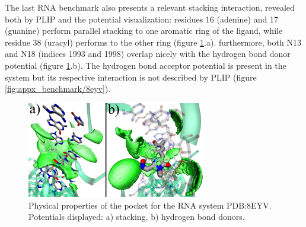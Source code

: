       The last RNA benchmark also presents a relevant stacking interaction, revealed both by PLIP and the potential visualization: residues 16 (adenine) and 17 (guanine) perform parallel stacking to one aromatic ring of the ligand, while residue 38 (uracyl) performs to the other ring (figure \ref{fig:benchmark/8eyv}.a). furthermore, both N13 and N18 (indices 1993 and 1998) overlap nicely with the hydrogen bond donor potential (figure \ref{fig:benchmark/8eyv}.b). The hydrogen bond acceptor potential is present in the system but its respective interaction is not described by PLIP (figure \ref{fig:appx_benchmark/8eyv}).

      \begin{figure}[H]
        \centering
        \includegraphics[width=0.7\textwidth]{figures/results/benchmark_rna/8eyv.png}
        \caption{\label{fig:benchmark/8eyv} Physical properties of the pocket for the RNA system PDB:8EYV. Potentials displayed: a) stacking, b) hydrogen bond donors.}
      \end{figure}
    \pagebreak


